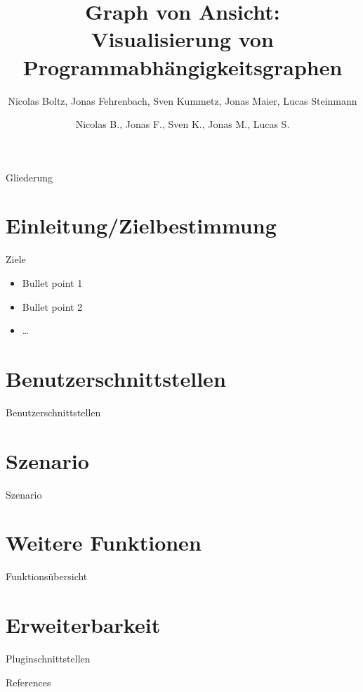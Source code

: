 \documentclass[18pt]{beamer}
\title[Graph von Ansicht]{Graph von Ansicht:\\ Visualisierung von Programmabhängigkeitsgraphen}
\subtitle{}
\author{Nicolas Boltz, Jonas Fehrenbach, Sven Kummetz, Jonas Maier, Lucas Steinmann}
\institute{}
\begin{document}

\begin{frame}
\titlepage
\end{frame}

\author{Nicolas B., Jonas F., Sven K., Jonas M., Lucas S.}
\begin{frame}{Gliederung}
\tableofcontents
\end{frame}

\section{Einleitung/Zielbestimmung}
\begin{frame}{Ziele}
\begin{itemize}
\item Bullet point 1
\pause
\item Bullet point 2
\item \dots
\end{itemize}
\end{frame}

\section{Benutzerschnittstellen}
\begin{frame}{Benutzerschnittstellen}
\end{frame}

\section{Szenario}
\begin{frame}{Szenario}
\end{frame}

\section{Weitere Funktionen}
\begin{frame}{Funktionsübersicht}
\end{frame}

\section{Erweiterbarkeit}
\begin{frame}{Pluginschnittstellen}
\end{frame}
\appendix
\beginbackup

\begin{frame}[allowframebreaks]{References}

\end{frame}

\backupend
\end{document}
